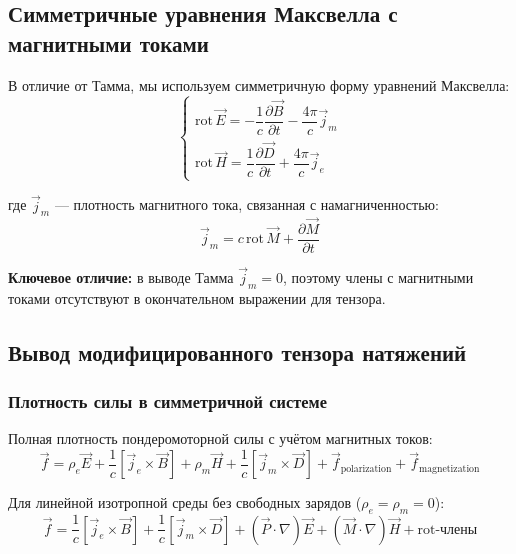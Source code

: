 \documentclass[a4paper,12pt]{article}
\begin{document}
\subsection{Симметричные уравнения Максвелла с магнитными токами}

В отличие от Тамма, мы используем симметричную форму уравнений Максвелла:
\begin{equation}
\begin{cases}
\text{rot}\,\vec{E} = -\dfrac{1}{c}\dfrac{\partial\vec{B}}{\partial t} - \dfrac{4\pi}{c}\vec{j}_m \\[10pt]
\text{rot}\,\vec{H} = \dfrac{1}{c}\dfrac{\partial\vec{D}}{\partial t} + \dfrac{4\pi}{c}\vec{j}_e
\end{cases}
\label{eq:symmetric_maxwell}
\end{equation}

где $\vec{j}_m$ --- плотность магнитного тока, связанная с намагниченностью:
\begin{equation}
\vec{j}_m = c\,\text{rot}\,\vec{M} + \frac{\partial\vec{M}}{\partial t}
\label{eq:magnetic_current}
\end{equation}

\textbf{Ключевое отличие:} в выводе Тамма $\vec{j}_m = 0$, поэтому члены с магнитными токами отсутствуют в окончательном выражении для тензора.

\subsection{Вывод модифицированного тензора натяжений}

\subsubsection{Плотность силы в симметричной системе}

Полная плотность пондеромоторной силы с учётом магнитных токов:
\begin{equation}
\vec{f} = \rho_e\vec{E} + \frac{1}{c}[\vec{j}_e\times\vec{B}] + \rho_m\vec{H} + \frac{1}{c}[\vec{j}_m\times\vec{D}] + \vec{f}_{\text{polarization}} + \vec{f}_{\text{magnetization}}
\label{eq:total_force_density}
\end{equation}

Для линейной изотропной среды без свободных зарядов ($\rho_e = \rho_m = 0$):
\begin{equation}
\vec{f} = \frac{1}{c}[\vec{j}_e\times\vec{B}] + \frac{1}{c}[\vec{j}_m\times\vec{D}] + (\vec{P}\cdot\nabla)\vec{E} + (\vec{M}\cdot\nabla)\vec{H} + \text{rot-члены}
\label{eq:force_no_charges}
\end{equation}
\end{document}
